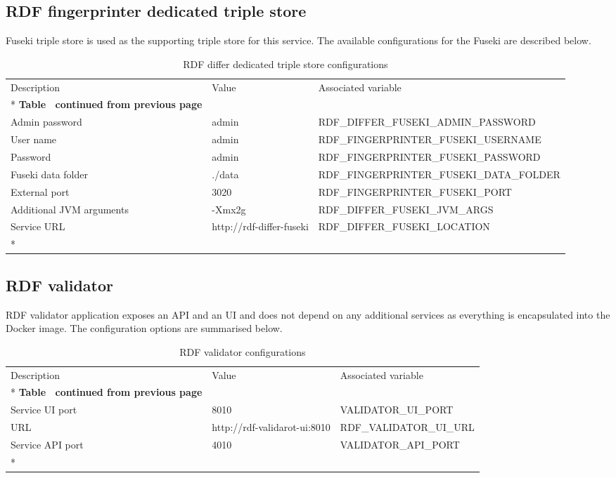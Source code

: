 	\subsection{RDF fingerprinter dedicated triple store}
	
	Fuseki triple store is used as the supporting triple store for this service.
	The available configurations for the Fuseki are described below. 
	
	
	\begin{longtable}[c]{@{}p{4cm}p{2.5cm}l@{}}
		\toprule
		Description & Value & Associated variable \\* \midrule
		\endfirsthead
		\multicolumn{3}{c}%
		{{\bfseries Table \thetable\ continued from previous page}} \\
		\endhead
		\bottomrule
		\endfoot
		\endlastfoot
		Admin password & admin & \footnotesize RDF\_DIFFER\_FUSEKI\_ADMIN\_PASSWORD \\
		User name & admin & \footnotesize RDF\_FINGERPRINTER\_FUSEKI\_USERNAME \\
		Password & admin & \footnotesize RDF\_FINGERPRINTER\_FUSEKI\_PASSWORD \\
		Fuseki data folder & ./data & \footnotesize RDF\_FINGERPRINTER\_FUSEKI\_DATA\_FOLDER \\
		External port & 3020 & \footnotesize RDF\_FINGERPRINTER\_FUSEKI\_PORT \\
		Additional JVM arguments & -Xmx2g & \footnotesize RDF\_DIFFER\_FUSEKI\_JVM\_ARGS \\
		Service URL & http://rdf-differ-fuseki & \footnotesize RDF\_DIFFER\_FUSEKI\_LOCATION \\* \bottomrule
		\caption{RDF differ dedicated triple store configurations}
		\label{tab:my-table8}\\
	\end{longtable}

	
	\subsection{RDF validator}
	
	RDF validator application exposes an API and an UI and does not depend on any additional services as everything is encapsulated into the Docker image. The configuration options are summarised below. 
	
	\begin{longtable}[c]{@{}p{4cm}p{5cm}l@{}}
		\toprule
		Description & Value & Associated variable \\* \midrule
		\endfirsthead
		\multicolumn{3}{c}%
		{{\bfseries Table \thetable\ continued from previous page}} \\
		\endhead
		\bottomrule
		\endfoot
		\endlastfoot
		Service UI port & 8010 & VALIDATOR\_UI\_PORT \\
		URL & http://rdf-validarot-ui:8010 & RDF\_VALIDATOR\_UI\_URL \\
		Service API port & 4010 & VALIDATOR\_API\_PORT \\* \bottomrule
		\caption{RDF validator configurations}
		\label{tab:my-table3}\\
	\end{longtable}

